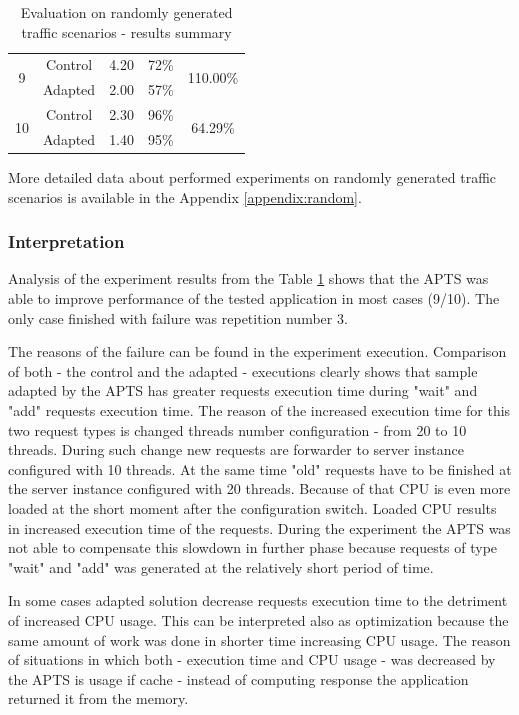 \documentclass[12pt,a4paper]{article}
\begin{document}
{\begin{table}[ht]
\begin{center}
\begin{tabular}{c c | c | c | c}
 \multirow{2}{*}{9} & Control&     4.20          &     72\%   & \multirow{2}{*}{110.00\%}\\  
                    & Adapted&     2.00          &     57\%   & \\ \hline 
 \multirow{2}{*}{10}& Control&     2.30          &     96\%   & \multirow{2}{*}{64.29\%}\\ 	  
                    & Adapted&     1.40          &     95\%   \\         
\end{tabular}
\end{center}
\caption{Evaluation on randomly generated traffic scenarios - results summary}
\label{table:random:resultssummary}
\end{table}
}

More detailed data about performed experiments on randomly generated traffic scenarios is available in the Appendix \ref{appendix:random}.

\subsubsection{Interpretation}

Analysis of the experiment results from the Table \ref{table:random:resultssummary} shows that the APTS was able to improve performance of the tested application in most cases (9/10).  The only case finished with failure was repetition number 3. 

The reasons of the failure can be found in the experiment execution. Comparison of both - the control and the adapted - executions clearly shows that sample adapted by the APTS has greater requests execution time during "wait" and "add" requests execution time. The reason of the increased execution time for this two request types is changed threads number configuration - from 20 to 10 threads. During such change new requests are forwarder to server instance configured with 10 threads. At the same time "old" requests have to be finished at the server instance configured with 20 threads. Because of that CPU is even more loaded at the short moment after the configuration switch. Loaded CPU results in increased execution time of the requests. During the experiment the APTS was not able to compensate this slowdown in further phase because requests of type "wait" and "add" was generated at the relatively short period of time. 

In some cases adapted solution decrease requests execution time to the detriment of increased CPU usage. This can be interpreted also as optimization because the same amount of work was done in shorter time increasing CPU usage. The reason of situations in which both - execution time and CPU usage - was decreased by the APTS is usage if cache - instead of computing response the application returned it from the memory. 
\end{document}
